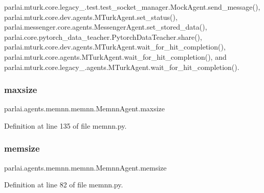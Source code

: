 parlai.\+mturk.\+core.\+legacy\+\_.\+test.\+test\+\_\+socket\+\_\+manager.\+Mock\+Agent.\+send\+\_\+message(), parlai.\+mturk.\+core.\+dev.\+agents.\+M\+Turk\+Agent.\+set\+\_\+status(), parlai.\+messenger.\+core.\+agents.\+Messenger\+Agent.\+set\+\_\+stored\+\_\+data(), parlai.\+core.\+pytorch\+\_\+data\+\_\+teacher.\+Pytorch\+Data\+Teacher.\+share(), parlai.\+mturk.\+core.\+dev.\+agents.\+M\+Turk\+Agent.\+wait\+\_\+for\+\_\+hit\+\_\+completion(), parlai.\+mturk.\+core.\+agents.\+M\+Turk\+Agent.\+wait\+\_\+for\+\_\+hit\+\_\+completion(), and parlai.\+mturk.\+core.\+legacy\+\_.\+agents.\+M\+Turk\+Agent.\+wait\+\_\+for\+\_\+hit\+\_\+completion().

\mbox{\label{classparlai_1_1agents_1_1memnn_1_1memnn_1_1MemnnAgent_aff26270b3e93fc2c0a69a184774ec55e}} 
\subsubsection{\texorpdfstring{maxsize}{maxsize}}
{\footnotesize\ttfamily parlai.\+agents.\+memnn.\+memnn.\+Memnn\+Agent.\+maxsize\hspace{0.3cm}{\ttfamily [static]}}



Definition at line 135 of file memnn.\+py.

\mbox{\label{classparlai_1_1agents_1_1memnn_1_1memnn_1_1MemnnAgent_a73e14a945e200d85f239a6d1f08c8d54}} 
\subsubsection{\texorpdfstring{memsize}{memsize}}
{\footnotesize\ttfamily parlai.\+agents.\+memnn.\+memnn.\+Memnn\+Agent.\+memsize}



Definition at line 82 of file memnn.\+py.



